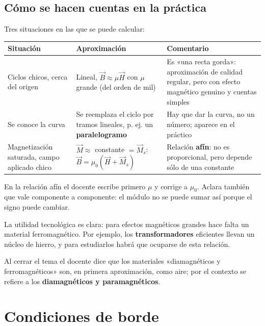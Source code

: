 \documentclass[12pt,a4paper]{article}
\begin{document}
\subsection{Cómo se hacen cuentas en la práctica}

Tres situaciones en las que se puede calcular:

\begin{center}
\renewcommand{\arraystretch}{1.35}
\small
\begin{tabularx}{\textwidth}{>{\raggedright\arraybackslash}X>{\raggedright\arraybackslash}X>{\raggedright\arraybackslash}X}
\toprule
\textbf{Situación} & \textbf{Aproximación} & \textbf{Comentario} \\
\midrule
Ciclos chicos, cerca del origen & Lineal, $\vec B\approx\mu\vec H$ con $\mu$ grande (del orden de mil) & Es «una recta gorda»: aproximación de calidad regular, pero con efecto magnético genuino y cuentas simples \\
Se conoce la curva & Se reemplaza el ciclo por tramos lineales, p. ej. un \textbf{paralelogramo} & Hay que dar la curva, no un número; aparece en el práctico \\
Magnetización saturada, campo aplicado chico & $\vec M\approx$ constante $=\vec M_s$: $\vec B = \mu_0(\vec H+\vec M_s)$ & Relación \textbf{afín}: no es proporcional, pero depende sólo de una constante \\
\bottomrule
\end{tabularx}
\end{center}

\begin{notebox}
En la relación afín el docente escribe primero $\mu$ y corrige a $\mu_0$.
Aclara también que vale componente a componente: el módulo no se puede sumar
así porque el signo puede cambiar.
\end{notebox}

La utilidad tecnológica es clara: para efectos magnéticos grandes hace falta un
material ferromagnético. Por ejemplo, los \textbf{transformadores} eficientes
llevan un núcleo de hierro, y para estudiarlos habrá que ocuparse de esta
relación.

\begin{notebox}
Al cerrar el tema el docente dice que los materiales «diamagnéticos y
ferromagnéticos» son, en primera aproximación, como aire; por el contexto se
refiere a los \textbf{diamagnéticos y paramagnéticos}.
\end{notebox}

\section{Condiciones de borde}
\end{document}
